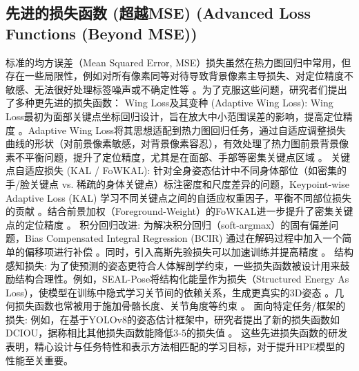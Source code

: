 \documentclass[12pt,a4paper]{article}
\begin{document}
\subsection{先进的损失函数 (超越MSE) (Advanced Loss Functions (Beyond MSE))}
标准的均方误差（Mean Squared Error, MSE）损失虽然在热力图回归中常用，但存在一些局限性，例如对所有像素同等对待导致背景像素主导损失、对定位精度不敏感、无法很好处理标签噪声或不确定性等 \cite{Huang2021BiasCompensated}。为了克服这些问题，研究者们提出了多种更先进的损失函数：
Wing Loss及其变种 (Adaptive Wing Loss): Wing Loss最初为面部关键点坐标回归设计，旨在放大中小范围误差的影响，提高定位精度 \cite{Feng2018WingLoss}。Adaptive Wing Loss将其思想适配到热力图回归任务，通过自适应调整损失曲线的形状（对前景像素敏感，对背景像素容忍），有效处理了热力图前景背景像素不平衡问题，提升了定位精度，尤其是在面部、手部等密集关键点区域 \cite{Wang2019AdaptiveWing}。
关键点自适应损失 (KAL / FoWKAL): 针对全身姿态估计中不同身体部位（如密集的手/脸关键点 vs. 稀疏的身体关键点）标注密度和尺度差异的问题，Keypoint-wise Adaptive Loss (KAL) 学习不同关键点之间的自适应权重因子，平衡不同部位损失的贡献 \cite{Geng2022KeypointAdaptiveLoss}。结合前景加权（Foreground-Weight）的FoWKAL进一步提升了密集关键点的定位精度 \cite{Geng2022KeypointAdaptiveLoss}。
积分回归改进: 为解决积分回归（soft-argmax）的固有偏差问题，Bias Compensated Integral Regression (BCIR) 通过在解码过程中加入一个简单的偏移项进行补偿 \cite{Huang2021BiasCompensated}。同时，引入高斯先验损失可以加速训练并提高精度 \cite{Huang2021BiasCompensated}。
结构感知损失: 为了使预测的姿态更符合人体解剖学约束，一些损失函数被设计用来鼓励结构合理性。例如，SEAL-Pose将结构化能量作为损失（Structured Energy As Loss），使模型在训练中隐式学习关节间的依赖关系，生成更真实的3D姿态 \cite{Bertoni2022SEALPose}。几何损失函数也常被用于施加骨骼长度、关节角度等约束 \cite{Martinez2017Simple3D}。
面向特定任务/框架的损失: 例如，在基于YOLOv8的姿态估计框架中，研究者提出了新的损失函数如DCIOU，据称相比其他损失函数能降低3-5的损失值 \cite{YourDCIOUPaperKey202X}。 %
这些先进损失函数的研发表明，精心设计与任务特性和表示方法相匹配的学习目标，对于提升HPE模型的性能至关重要。
\end{document}
